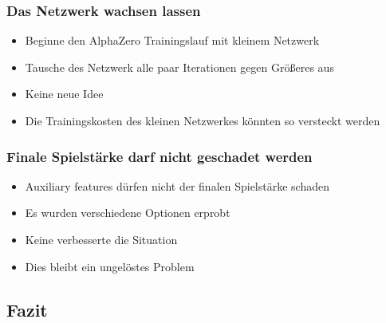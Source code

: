 \begin{frame}
 \frametitle{Das Netzwerk wachsen lassen}
  


\begin{itemize}
  \item \pause Beginne den AlphaZero Trainingslauf mit kleinem Netzwerk
  \item \pause Tausche des Netzwerk alle paar Iterationen gegen Größeres aus
  \item \pause Keine neue Idee
  \item \pause Die Trainingskosten des kleinen Netzwerkes könnten so versteckt werden
\end{itemize}


  
\end{frame}
\begin{frame}
 \frametitle{Finale Spielstärke darf nicht geschadet werden}
  


\begin{itemize}
  \item \pause Auxiliary features dürfen nicht der finalen Spielstärke schaden
  \item \pause Es wurden verschiedene Optionen erprobt
  \item \pause Keine verbesserte die Situation
  \item \pause Dies bleibt ein ungelöstes Problem
\end{itemize}

  
\end{frame}

\subsection{Fazit}



